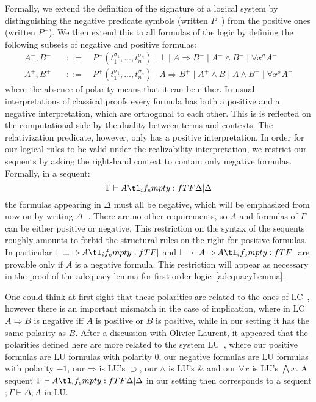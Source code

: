 \documentclass{CSML}
\renewcommand{\ldots}{...}
\newcommand*\ifpresent[3]{\tl_if_empty:fTF{#1}{#3}{#2}}
\newcommand*\GramDef{\quad\mathrel{::=}\quad}
\newcommand*\Entails{\mathrel{\vdash}}
\newcommand*\BarSep{\mathrel{|}}
\newcommand*\Sequent[3]{#1\Entails#2\ifpresent{#3}{\BarSep}{}#3}
\newcommand*\SortA{\sigma}
\newcommand*\LogSortedTerm[2]{#1^{#2}}
\newcommand*\LogTermA{t}
\newcommand*\LogVarA{x}
\newcommand*\LogNeg[1]{{#1^-}}
\newcommand*\LogPos[1]{{#1^+}}
\newcommand*\LogImp{\mathbin{\Rightarrow}}
\newcommand*\LogAnd{\mathbin{\wedge}}
\newcommand*\LogBot\bot
\newcommand*\LogFormA{A}
\newcommand*\LogFormB{B}
\newcommand*\LogPredA{P}
\begin{document}
Formally, we extend the definition of the signature of a logical system by distinguishing the negative predicate symbols (written $\LogNeg{\LogPredA}$) from the positive ones (written $\LogPos{\LogPredA}$). We then extend this to all formulas of the logic by defining the following subsets of negative and positive formulas:
\begin{align*}
\LogNeg{\LogFormA},\LogNeg{\LogFormB}&\GramDef\LogNeg{\LogPredA}\left(\LogSortedTerm{\LogTermA_1}{\SortA_1},\ldots,\LogSortedTerm{\LogTermA_n}{\SortA_n}\right)\BarSep\LogBot\BarSep\LogFormA\LogImp\LogNeg{\LogFormB}\BarSep\LogNeg{\LogFormA}\LogAnd\LogNeg{\LogFormB}\BarSep\forall\LogSortedTerm{\LogVarA}{\SortA}\LogNeg{\LogFormA}\\
\LogPos{\LogFormA},\LogPos{\LogFormB}&\GramDef\LogPos{\LogPredA}\left(\LogSortedTerm{\LogTermA_1}{\SortA_1},\ldots,\LogSortedTerm{\LogTermA_n}{\SortA_n}\right)\BarSep\LogFormA\LogImp\LogPos{\LogFormB}\BarSep\LogPos{\LogFormA}\LogAnd\LogFormB\BarSep\LogFormA\LogAnd\LogPos{\LogFormB}\BarSep\forall\LogSortedTerm{\LogVarA}{\SortA}\LogPos{\LogFormA}
\end{align*}
where the absence of polarity means that it can be either. In usual interpretations of classical proofs every formula has both a positive and a negative interpretation, which are orthogonal to each other. This is is reflected on the computational side by the duality between terms and contexts. The relativization predicate, however, only has a positive interpretation. In order for our logical rules to be valid under the realizability interpretation, we restrict our sequents by asking the right-hand context to contain only negative formulas. Formally, in a sequent:
$$\Sequent{\Gamma}{\LogFormA}{\Delta}$$
the formulas appearing in $\Delta$ must all be negative, which will be emphasized from now on by writing $\LogNeg{\Delta}$. There are no other requirements, so $\LogFormA$ and formulas of $\Gamma$ can be either positive or negative. This restriction on the syntax of the sequents roughly amounts to forbid the structural rules on the right for positive formulas. In particular $\Sequent{}{\LogBot\LogImp\LogFormA}{}$ and $\Sequent{}{\neg\neg\LogFormA\LogImp\LogFormA}{}$ are provable only if $\LogFormA$ is a negative formula. This restriction will appear as necessary in the proof of the adequacy lemma for first-order logic~\ref{adequacyLemma}.\par
One could think at first sight that these polarities are related to the ones of LC~\cite{GirardLC}, however there is an important mismatch in the case of implication, where in LC $\LogFormA\LogImp\LogFormB$ is negative iff $\LogFormA$ is positive or $\LogFormB$ is positive, while in our setting it has the same polarity as $\LogFormB$. After a discussion with Olivier Laurent, it appeared that the polarities defined here are more related to the system LU~\cite{GirardLU}, where our positive formulas are LU formulas with polarity $0$, our negative formulas are LU formulas with polarity $-1$, our $\LogImp$ is LU's $\supset$, our $\LogAnd$ is LU's $\&$ and our $\forall\LogVarA$ is LU's $\bigwedge\LogVarA$. A sequent $\Sequent{\Gamma}{\LogFormA}{\Delta}$ in our setting then corresponds to a sequent $;\Gamma\vdash\Delta;\LogFormA$ in LU.\par
\end{document}
